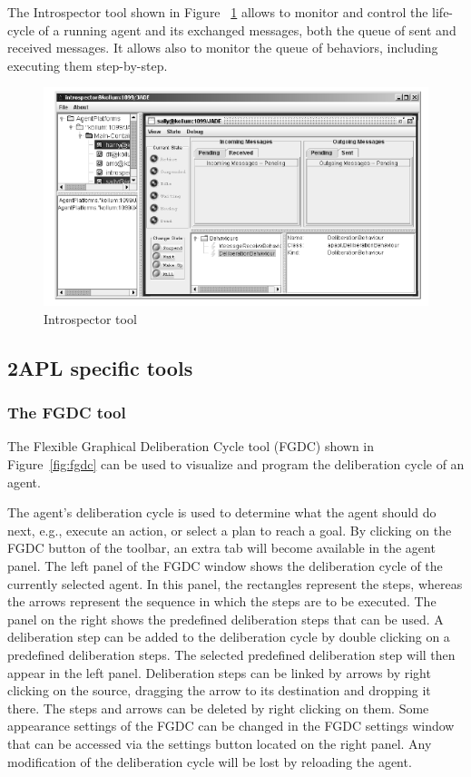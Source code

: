 \documentclass[a4paper]{article}
\begin{document}
The Introspector tool shown in Figure ~\ref{fig:introspector} allows to monitor and control the life-cycle of a running agent and its exchanged messages, both the queue of sent and received messages. It allows also to monitor the queue of behaviors, including executing them step-by-step.

\begin{figure}[htp]
\centering
\includegraphics[keepaspectratio,scale=0.8]{fig/introspector.png}
\caption{Introspector tool}
\label{fig:introspector}
\end{figure}

\subsection{2APL specific tools}

\subsubsection{The FGDC tool}

The Flexible Graphical Deliberation Cycle tool (FGDC) shown in Figure~\ref{fig:fgdc} can be used to visualize and program the deliberation cycle of an agent.

The agent's deliberation cycle is used to determine what the agent should do next, e.g., execute an action, or select a plan to reach a goal. By clicking on the FGDC button of the toolbar, an extra tab will become available in the agent panel. The left panel of the FGDC window shows the deliberation cycle of the currently selected agent. In this panel, the rectangles represent the steps, whereas the arrows represent the sequence in which the steps are to be executed. The panel on the right shows the predefined deliberation steps that can be used. A deliberation step can be added to the deliberation cycle by double clicking on a predefined deliberation steps. The selected predefined deliberation step will then appear in the left panel. Deliberation steps can be linked by arrows by right clicking on the source, dragging the arrow to its destination and dropping it there. The steps and arrows can be deleted by right clicking on them. Some appearance settings of the FGDC can be changed in the FGDC settings window that can be accessed via the settings button located on the right panel. Any modification of the deliberation cycle will be lost by reloading the agent.
\end{document}
